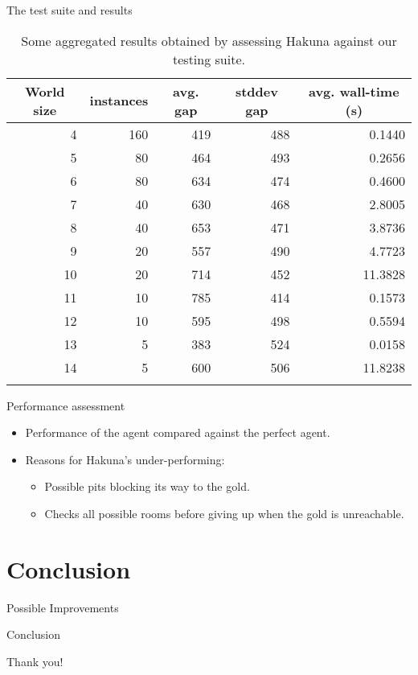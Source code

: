 \documentclass[smaller,dvipsnames,ratio=169]{beamer}
\begin{document}
  \begin{frame}{The test suite and results}
    \begin{table}[t]
      	\label{tbl:test}
      	\centering
      	\begin{tabular}{rrrrr}
      		\toprule
      		\multicolumn{1}{c}{World size} & \multicolumn{1}{c}{instances} & \multicolumn{1}{c}{avg. gap} & \multicolumn{1}{c}{stddev gap} & \multicolumn{1}{c}{avg. wall-time (s)}\\
      		\midrule
      		4 & 160	& 419 & 488 & 0.1440 \\
      		5 & 80  & 464 & 493 & 0.2656 \\
      		6 & 80  & 634 & 474 & 0.4600 \\
      		7 & 40  & 630 & 468 & 2.8005 \\
      		8 & 40  & 653 & 471 & 3.8736 \\
      		9 & 20  & 557 & 490 & 4.7723 \\
      		10 & 20 & 714 & 452 & 11.3828 \\
      		11 & 10 & 785 & 414 & 0.1573 \\
      		12 & 10 & 595 & 498 & 0.5594 \\
      		13 & 5  & 383 & 524 & 0.0158 \\
      		14 & 5  & 600 & 506 & 11.8238 \\
      		\bottomrule\\
      	\end{tabular}
      	\caption{Some aggregated results obtained by assessing Hakuna against our testing suite.}
      \end{table}
   \end{frame}

	\begin{frame}{Performance assessment}
		\begin{itemize}
			\item Performance of the agent compared against the perfect agent.
			\item Reasons for Hakuna's under-performing: 
			\begin{itemize}
				\item Possible pits blocking its way to the gold.
				\item Checks all possible rooms before giving up when the gold is unreachable.
			
			\end{itemize}
		\end{itemize}
	\end{frame}

	

  \section{Conclusion}

  \begin{frame}{Possible Improvements}
  \end{frame}

  \begin{frame}{Conclusion}
  \end{frame}

  \begin{frame}[standout]
    Thank you!
  \end{frame}
\end{document}
